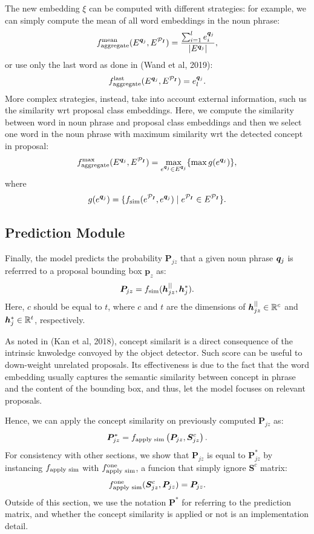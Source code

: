 \documentclass{article}
\begin{document}
The new embedding $\xi$ can be computed with different strategies: for
example, we can simply compute the mean of all word embeddings in the
noun phrase:
\begin{equation}
  f_{\text{aggregate}}^{\text{mean}}(E^{\bm{q}_j}, E^{\mathcal{P}_{\bm{I}}}) = \frac{\sum^l_{i=1} e^{\bm{q}_j}_i}{| E^{\bm{q}_j} |},
\end{equation}
or use only the last word as done in (Wand et al, 2019):
\begin{equation}
  f_{\text{aggregate}}^{\text{last}}(E^{\bm{q}_j}, E^{\mathcal{P}_{\bm{I}}}) = e^{\bm{q}_j}_l.
\end{equation}
More complex strategies, instead, take into account external
information, such us the similarity wrt proposal class embeddings.
Here, we compute the similarity between word in noun phrase and
proposal class embeddings and then we select one word in the noun
phrase with maximum similarity wrt the detected concept in proposal:
\begin{equation}
  f_{\text{aggregate}}^{\text{max}}(E^{\bm{q}_j}, E^{\mathcal{P}_{\bm{I}}}) = \max_{e^{\bm{q}_j} \in E^{\bm{q}_j}} \{ \max g(e^{\bm{q}_j}) \},
\end{equation}
where
\begin{equation}
  g(e^{\bm{q}_j}) = \{ f_{\text{sim}}(e^{\mathcal{P}_{\bm{I}}}, e^{\bm{q}_j}) \mid e^{\mathcal{P}_{\bm{I}}} \in E^{\mathcal{P}_{\bm{I}}} \}.
\end{equation}

\subsection{Prediction Module}

Finally, the model predicts the probability $\bm{P}_{jz}$ that a given
noun phrase $\bm{q}_j$ is referrred to a proposal bounding box $\bm{p}_z$
as:
\begin{equation}
  \bm{P}_{jz} = f_{\text{sim}} ( \bm{h}^{||}_{jz} , \bm{h}^*_j ).
\end{equation}
Here, $c$ should be equal to $t$, where $c$ and $t$ are the dimensions
of $\bm{h}^{||}_{jz} \in \mathbb{R}^c$ and $\bm{h}^*_j \in \mathbb{R}^t$,
respectively.

As noted in (Kan et al, 2018), concept similarit is a direct
consequence of the intrinsic knwoledge convoyed by the object
detector. Such score can be useful to down-weight unrelated proposals.
Its effectiveness is due to the fact that the word embedding usually
captures the semantic similarity between concept in phrase and the
content of the bounding box, and thus, let the model focuses on
relevant proposals.


Hence, we can apply the concept similarity on previously computed
$\bm{P}_{jz}$ as:
\begin{equation}
  \bm{P}^*_{jz} = f_{\text{apply sim}} \left( \bm{P}_{jz} , \bm{S}^c_{jz} \right).
\end{equation}
For consistency with other sections, we show that $\bm{P}_{jz}$ is
equal to $\bm{P}^*_{jz}$ by instancing $f_{\text{apply sim}}$ with
$f_{\text{apply sim}}^{\text{one}}$, a funcion that simply ignore $\bm{S}^c$
matrix:
\begin{equation}
  f_{\text{apply sim}}^{\text{one}} (\bm{S}^c_{jz}, \bm{P}_{jz}) = \bm{P}_{jz}.
\end{equation}
Outside of this section, we use the notation $\bm{P}^*$ for referring
to the prediction matrix, and whether the concept similarity is
applied or not is an implementation detail.
\end{document}

